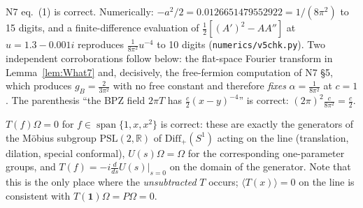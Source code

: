 \documentclass[11pt]{article}
\begin{document}
\begin{verdictok}
N7 eq.~(1) is correct.  Numerically: $-a^2/2=0.0126651479552922=1/(8\pi^2)$ to 15 digits, and a finite-difference
evaluation of $\frac12[(A')^2-AA'']$ at $u=1.3-0.001i$ reproduces $\frac1{8\pi^2}u^{-4}$ to 10 digits
(\texttt{numerics/v5chk.py}).  Two independent corroborations follow below: the flat-space Fourier transform
in Lemma~\ref{lem:What7} and, decisively, the free-fermion computation of N7 \S5, which produces
$g_B=\frac2{3\pi^2}$ with no free constant and therefore \emph{fixes} $\alpha=\frac1{8\pi^2}$ at $c=1$.
The parenthesis ``the BPZ field $2\pi T$ has $\frac c2(x-y)^{-4}$'' is correct: $(2\pi)^2\frac c{8\pi^2}=\frac c2$.
\end{verdictok}

\begin{verdictok}
$T(f)\Omega=0$ for $f\in\operatorname{span}\{1,x,x^2\}$ is correct: these are exactly the generators of the
M\"obius subgroup $\mathrm{PSL}(2,\mathbb R)$ of $\mathrm{Diff}_+(S^1)$ acting on the line (translation, dilation, special
conformal), $U(s)\Omega=\Omega$ for the corresponding one-parameter groups, and $T(f)=-i\frac{d}{ds}U(s)|_{s=0}$
on the domain of the generator.  Note that this is the only place where the \emph{unsubtracted} $T$ occurs;
$\langle T(x)\rangle=0$ on the line is consistent with $T(\mathbf 1)\Omega=P\Omega=0$.
\end{verdictok}
\end{document}
